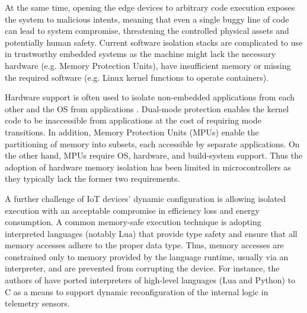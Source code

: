 At the same time, opening the edge devices to arbitrary code execution exposes the system to malicious intents, meaning that even a single buggy line of code can lead to system compromise, threatening the controlled physical assets and potentially human safety. Current software isolation stacks are complicated to use in trustworthy embedded systems as the machine might lack the necessary hardware (e.g. Memory Protection Units), have insufficient memory or missing the required software (e.g. Linux kernel functions to operate containers). 

Hardware support is often used to isolate non-embedded applications from each other and the OS from applications \cite{peach2020ewasm}. Dual-mode protection enables the kernel code to be inaccessible from applications at the cost of requiring mode transitions. In addition, Memory Protection Units (MPUs) enable the partitioning of memory into subsets, each accessible by separate applications. 
On the other hand, MPUs require OS, hardware, and build-system support. Thus the adoption of hardware memory isolation has been limited in microcontrollers as they typically lack the former two requirements.

A further challenge of IoT devices' dynamic configuration is allowing isolated execution with an acceptable compromise in efficiency loss and energy consumption. A common memory-safe execution technique is adopting interpreted languages (notably Lua) that provide type safety and ensure that all memory accesses adhere to the proper data type. Thus, memory accesses are constrained only to memory provided by the language runtime, usually via an interpreter, and are prevented from corrupting the device. For instance, the authors of \cite{brzoza2016embedded} have ported interpreters of high-level languages (Lua and Python) to C as a means to support dynamic reconfiguration of the internal logic in telemetry sensors.


